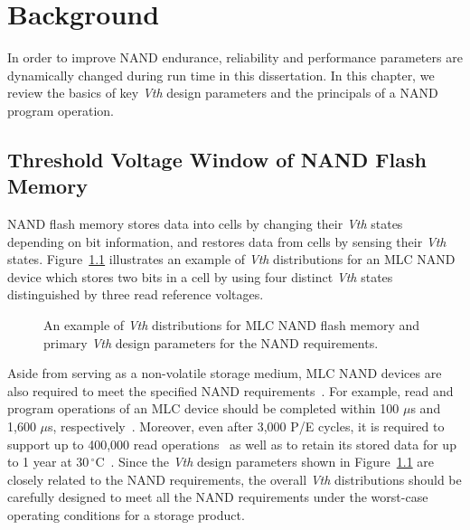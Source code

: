 
\chapter{Background} 
\label{chap:Background}


In order to improve NAND endurance, reliability and performance parameters are dynamically changed during run time in this dissertation.
In this chapter, we review the basics of key \textit{Vth} design parameters and the principals of a NAND program operation.


\section{Threshold Voltage Window of NAND Flash Memory}
\label{sec:Background_ThresholdVoltageWindow}

NAND flash memory stores data into cells by changing their \textit{Vth} states depending on bit information, and restores data from cells by sensing their \textit{Vth} states.
Figure~\ref{fig:Background_VthDistribution} illustrates an example of \textit{Vth} distributions for an MLC NAND device which stores two bits in a cell by using four distinct \textit{Vth} states distinguished by three read reference voltages.


\begin{figure}[t]
\centering
\caption{An example of \textit{Vth} distributions for MLC NAND flash memory and primary \textit{Vth} design parameters for the NAND requirements.}
\label{fig:Background_VthDistribution}
\end{figure}


Aside from serving as a non-volatile storage medium, MLC NAND devices are also required to meet the specified NAND requirements~\cite{Flash_Brewer}.
For example, read and program operations of an MLC device should be completed within 100 $\mu$s and 1,600 $\mu$s, respectively~\cite{MooresLaw_chien}.
Moreover, even after 3,000 P/E cycles, it is required to support up to 400,000 read operations~\cite{MooresLaw_chien} as well as to retain its stored data for up to 1 year at $30\,^{\circ}\mathrm{C}$~\cite{Cox_JEDEC}.
Since the \textit{Vth} design parameters shown in Figure~\ref{fig:Background_VthDistribution} are closely related to the NAND requirements, the overall \textit{Vth} distributions should be carefully designed to meet all the NAND requirements under the worst-case operating conditions for a storage product.


